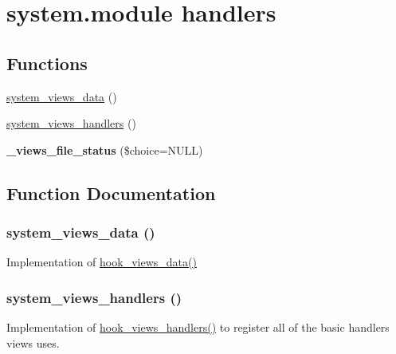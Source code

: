 \hypertarget{group__views__system__module}{
\section{system.module handlers}
\label{group__views__system__module}
}
\subsection*{Functions}
\begin{CompactItemize}
\item 
\hyperlink{group__views__system__module_g9720aa1df32a1efc1bdaaf6f372c38c3}{system\_\-views\_\-data} ()
\item 
\hyperlink{group__views__system__module_g5ce933162702acb94a6e2c7f94107646}{system\_\-views\_\-handlers} ()
\item 
\hypertarget{group__views__system__module_gdbb8ffa6a78abd312f9145c6f2ec3403}{
\textbf{\_\-views\_\-file\_\-status} (\$choice=NULL)}
\label{group__views__system__module_gdbb8ffa6a78abd312f9145c6f2ec3403}

\end{CompactItemize}


\subsection{Function Documentation}
\hypertarget{group__views__system__module_g9720aa1df32a1efc1bdaaf6f372c38c3}{
\subsubsection[{system\_\-views\_\-data}]{\setlength{\rightskip}{0pt plus 5cm}system\_\-views\_\-data ()}}
\label{group__views__system__module_g9720aa1df32a1efc1bdaaf6f372c38c3}


Implementation of \hyperlink{group__views__hooks_g227057901681e4a33e33c199c7a8c989}{hook\_\-views\_\-data()} \hypertarget{group__views__system__module_g5ce933162702acb94a6e2c7f94107646}{
\subsubsection[{system\_\-views\_\-handlers}]{\setlength{\rightskip}{0pt plus 5cm}system\_\-views\_\-handlers ()}}
\label{group__views__system__module_g5ce933162702acb94a6e2c7f94107646}


Implementation of \hyperlink{group__views__hooks_gbf506f44bd8d8a86876f27396f5341ed}{hook\_\-views\_\-handlers()} to register all of the basic handlers views uses. 